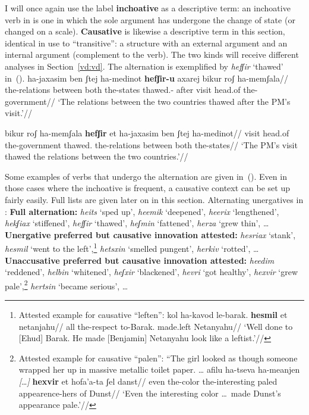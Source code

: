 I will once again use the label \textbf{inchoative} as a descriptive term: an inchoative verb in {\thif} is one in which the sole argument has undergone the change of state (or changed on a scale). \textbf{Causative} is likewise a descriptive term in this section, identical in use to ``transitive'': a structure with an external argument and an internal argument (complement to the verb). The two kinds will receive different analyses in Section~\ref{vd:vd}. The alternation is exemplified by \emph{hefʃir} `thawed' in~(\nextx).
\pex\label{ex:vd:thif-hefSir}
	\a \begingl
		\gla ha-jaxasim ben ʃtej ha-medinot \textbf{hefʃir-u} axarej bikur roʃ ha-memʃala//
		\glb the-relations between both the-states thawed.- after visit head.of the-government//
		\glft `The relations between the two countries thawed after the PM's visit.'//
		\endgl
	
	\a \begingl
		\gla bikur roʃ ha-memʃala \textbf{hefʃir} et ha-jaxasim ben ʃtej ha-medinot//
		\glb visit head.of the-government thawed.  the-relations between both the-states//
		\glft `The PM's visit thawed the relations between the two countries.'//
		\endgl
\xe

Some examples of verbs that undergo the alternation are given in~(\nextx). Even in those cases where the inchoative is frequent, a causative context can be set up fairly easily. Full lists are given later on in this section.
\pex\label{ex:vd:thif-alt}Alternating unergatives in \thif:
	\a \textbf{Full alternation:} \emph{hei{ts}} `sped up', \emph{heemik} `deepened', \emph{heerix} `lengthened', \emph{hekʃiax} `stiffened', \emph{hefʃir} `thawed', \emph{heʃmin} `fattened', \emph{herza} `grew thin', \dots
	\a \textbf{Unergative preferred but causative innovation attested:} \emph{hesriax} `stank', \emph{hesmil} `went to the left',\footnote{Attested example for causative ``leften'':
	\ex
		\begingl
		\gla kol ha-kavod le-barak. \textbf{hesmil} et netanjahu//
		\glb all the-respect to-Barak. made.left  Netanyahu//
		\glft `Well done to [Ehud] Barak. He made [Benjamin] Netanyahu look like a leftist.'//
		\endgl
	\xe
	} \emph{he{ts}xin} `smelled pungent', \emph{herkiv} `rotted', \dots
	\a \textbf{Unaccusative preferred but causative innovation attested:} \emph{heedim} `reddened', \emph{helbin} `whitened', \emph{heʃxir} `blackened', \emph{hevri} `got healthy',
		\emph{hexvir} `grew pale',\footnote{Attested example for causative ``palen'':
		\ex ``The girl looked as though someone wrapped her up in massive metallic toilet paper. \dots
			\begingl
			\gla afilu ha-tseva ha-meanjen \emph{[}\dots\emph{]} \textbf{hexvir} et hofa'a-ta ʃel danst//
			\glb even the-color the-interesting {} paled  appearence-hers of Dunst//
			\glft `Even the interesting color \dots~made Dunst's appearance pale.'//
			\endgl
		\xe
		} \emph{her{ts}in} `became serious', \dots
\xe

